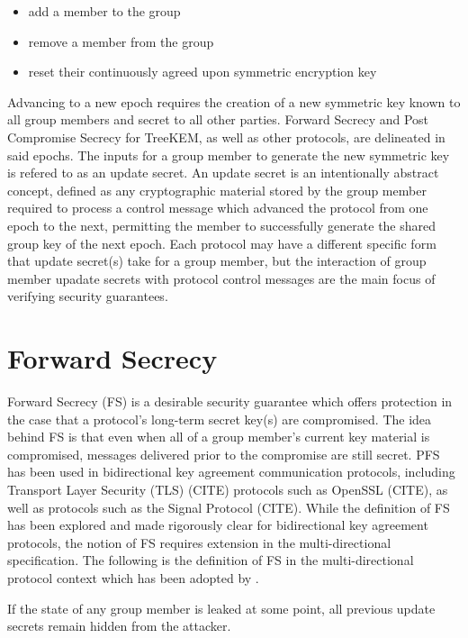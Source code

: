 \begin{itemize}
  \item
    add a member to the group
  \item
    remove a member from the group
  \item
    reset their continuously agreed upon symmetric encryption key
  \end{itemize}

Advancing to a new epoch requires the creation of a new symmetric key known to all group members and secret to all other parties.
Forward Secrecy and Post Compromise Secrecy for TreeKEM, as well as other  protocols, are delineated in said epochs.
The inputs for a group member to generate the new symmetric key is refered to as an update secret.
An update secret is an intentionally abstract concept, defined as any cryptographic material stored by the group member required to process a control message which advanced the protocol from one epoch to the next, permitting the member to successfully generate the shared group key of the next epoch.
Each protocol may have a different specific form that update secret(s) take for a group member, but the interaction of group member upadate secrets with protocol control messages are the main focus of verifying security guarantees.


\hypertarget{forward-secrecy}{%
\section{Forward Secrecy}\label{forward-secrecy}}

Forward Secrecy (FS) is a desirable security guarantee which offers protection in the case that a protocol's long-term secret key(s) are compromised.
The idea behind FS is that even when all of a group member's current key material is compromised, messages delivered prior to the compromise are still secret.
PFS has been used in bidirectional key agreement communication protocols, including Transport Layer Security (TLS) (CITE) protocols such as OpenSSL (CITE), as well as  protocols such as the Signal Protocol (CITE).
While the definition of FS has been explored and made rigorously clear for bidirectional key agreement protocols, the notion of FS requires extension in the multi-directional  specification.
The following is the definition of FS in the multi-directional protocol context \autocite{alwen2020security} which has been adopted by .

\begin{definition}
If the state of any group member is leaked at some point, all previous update secrets remain hidden from the attacker.
\end{definition}


